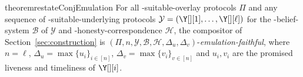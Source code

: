 \begin{restatable}[Emulation]{theorem}{restateConjEmulation}\label{conj:emulation}
  For all \rollerblade-suitable-overlay protocols $\Pi$
  and any sequence of \rollerblade-suitable-underlying
  protocols $\mathcal{Y} = (\Y[][1], \ldots, \Y[][\ell])$
  for the \rollerblade-belief-system $\mathcal{B}$ of $\mathcal{Y}$
  and \rollerblade-honesty-correspondence $\mathcal{H}$,
  the compositor \rollerblade of Section~\ref{sec:construction} is
  $(\Pi, n, \mathcal{Y}, \mathcal{B}, \mathcal{H}, \Delta_u, \Delta_v)$-\emph{emulation-faithful},
  where $n = \ell$, $\Delta_u = \max\{u_i\}_{i \in [n]}$,
  $\Delta_v = \max\{v_i\}_{v \in [n]}$
  and $u_i, v_i$ are the promised liveness and timeliness of $\Y[][i]$.
\end{restatable}

